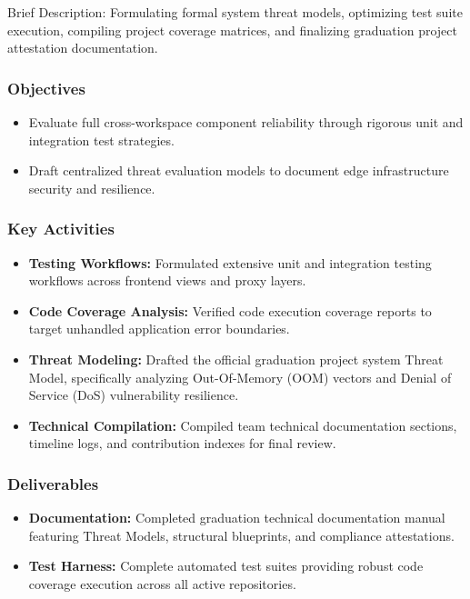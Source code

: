Brief Description: Formulating formal system threat models, optimizing test suite execution, compiling project coverage matrices, and finalizing graduation project attestation documentation.

\subsubsection{Objectives}
\begin{itemize}
    \item Evaluate full cross-workspace component reliability through rigorous unit and integration test strategies.
    \item Draft centralized threat evaluation models to document edge infrastructure security and resilience.
\end{itemize}

\subsubsection{Key Activities}
\begin{itemize}
    \item \textbf{Testing Workflows:} Formulated extensive unit and integration testing workflows across frontend views and proxy layers.
    \item \textbf{Code Coverage Analysis:} Verified code execution coverage reports to target unhandled application error boundaries.
    \item \textbf{Threat Modeling:} Drafted the official graduation project system Threat Model, specifically analyzing Out-Of-Memory (OOM) vectors and Denial of Service (DoS) vulnerability resilience.
    \item \textbf{Technical Compilation:} Compiled team technical documentation sections, timeline logs, and contribution indexes for final review.
\end{itemize}

\subsubsection{Deliverables}
\begin{itemize}
    \item \textbf{Documentation:} Completed graduation technical documentation manual featuring Threat Models, structural blueprints, and compliance attestations.
    \item \textbf{Test Harness:} Complete automated test suites providing robust code coverage execution across all active repositories.
\end{itemize}

